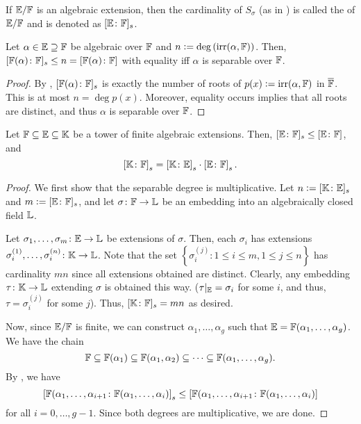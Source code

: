 \begin{defn}
    If $\mathbb{E}/\mathbb{F}$ is an algebraic extension, then the cardinality of $S_{\sigma}$ (as in ) is called the  of $\mathbb{E}/\mathbb{F}$ and is denoted as $[ \mathbb{E}\colon\mathbb{F}]_s$.
\end{defn}

\begin{prop} \label{prop:separable-leq-actual}
    Let $\alpha \in \mathbb{E} \supseteq \mathbb{F}$ be algebraic over $\mathbb{F}$ and $n \vcentcolon= \deg \left( \operatorname{irr}(\alpha, \mathbb{F}) \right)$. Then, $[\mathbb{F}(\alpha) \colon \mathbb{F}]_s \leq n = [\mathbb{F}(\alpha) \colon \mathbb{F}]$ with equality iff $\alpha$ is separable over $\mathbb{F}$.
\end{prop}
\begin{proof}
    By , $[\mathbb{F}(\alpha) \colon \mathbb{F}]_s$ is exactly the number of roots of $p(x) \vcentcolon= \operatorname{irr}(\alpha, \mathbb{F})$ in $\overline{\mathbb{F}}$. This is at most $n = \deg p(x)$. Moreover, equality occurs implies that all roots are distinct, and thus $\alpha$ is separable over $\mathbb{F}$.
\end{proof}

\begin{theorem} \label{thm:tower-separable}
    Let $\mathbb{F} \subseteq \mathbb{E} \subseteq \mathbb{K}$ be a tower of finite algebraic extensions. Then, $[\mathbb{E}\colon\mathbb{F}]_s \leq [\mathbb{E}\colon\mathbb{F}]$, and
    \[
        \left[ \mathbb{K}  \colon \mathbb{F} \right]_s = \left[ \mathbb{K}  \colon \mathbb{E} \right]_s \cdot \left[ \mathbb{E}  \colon \mathbb{F} \right]_s.
    \]
\end{theorem}
\begin{proof}
    We first show that the separable degree is multiplicative. Let $n \vcentcolon= [\mathbb{K} \colon \mathbb{E}]_s$ and $m \vcentcolon= [\mathbb{E} \colon \mathbb{F}]_s$, and let $\sigma \colon \mathbb{F} \to \mathbb{L}$ be an embedding into an algebraically closed field $\mathbb{L}$.
    
    Let $\sigma_1, \ldots, \sigma_m \colon \mathbb{E} \to \mathbb{L}$ be extensions of $\sigma$. Then, each $\sigma_i$ has extensions $\sigma_i^{(1)},\ldots,\sigma_i^{(n)} \colon \mathbb{K} \to \mathbb{L}$. Note that the set $\left\{ \sigma_i^{(j)} \colon 1 \leq i \leq m, 1 \leq j \leq n \right\}$ has cardinality $mn$ since all extensions obtained are distinct. Clearly, any embedding $\tau \colon \mathbb{K} \to \mathbb{L}$ extending $\sigma$ is obtained this way. ($\tau |_{\mathbb{E}} = \sigma_i$ for some $i$, and thus, $\tau = \sigma_i^{(j)}$ for some $j$). Thus, $[\mathbb{K} \colon \mathbb{F}]_s = mn$ as desired.
    
    Now, since $\mathbb{E}/\mathbb{F}$ is finite, we can construct $\alpha_1, \ldots, \alpha_g$ such that $\mathbb{E} = \mathbb{F}(\alpha_1, \ldots, \alpha_g)$. We have the chain
    \[
        \mathbb{F} \subseteq \mathbb{F}(\alpha_1) \subseteq \mathbb{F}(\alpha_1, \alpha_2) \subseteq \cdots \subseteq \mathbb{F}(\alpha_1, \ldots, \alpha_g).
    \]
    By , we have
    \[
        \left[ \mathbb{F}(\alpha_1, \ldots, \alpha_{i+1} \colon \mathbb{F}(\alpha_1, \ldots, \alpha_i) \right]_s \leq \left[ \mathbb{F}(\alpha_1, \ldots, \alpha_{i+1} \colon \mathbb{F}(\alpha_1, \ldots, \alpha_i) \right]
    \]
    for all $i = 0,\ldots,g-1$. Since both degrees are multiplicative, we are done. 
\end{proof}

